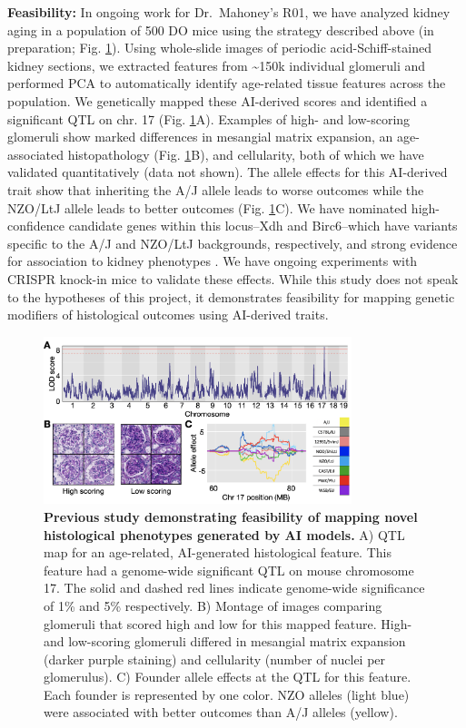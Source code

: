 \documentclass[
  12pt,
]{article}
\begin{document}
\textbf{Feasibility:} In ongoing work for Dr.~Mahoney's R01, we have
analyzed kidney aging in a population of 500 DO mice using the strategy
described above (in preparation; Fig. \ref{fig:histo}). Using
whole-slide images of periodic acid-Schiff-stained kidney sections, we
extracted features from \textasciitilde150k individual glomeruli and
performed PCA to automatically identify age-related tissue features
across the population. We genetically mapped these AI-derived scores and
identified a significant QTL on chr. 17 (Fig. \ref{fig:histo}A).
Examples of high- and low-scoring glomeruli show marked differences in
mesangial matrix expansion, an age-associated histopathology (Fig.
\ref{fig:histo}B), and cellularity, both of which we have validated
quantitatively (data not shown). The allele effects for this AI-derived
trait show that inheriting the A/J allele leads to worse outcomes while
the NZO/LtJ allele leads to better outcomes (Fig. \ref{fig:histo}C). We
have nominated high-confidence candidate genes within this locus--Xdh
and Birc6--which have variants specific to the A/J and NZO/LtJ
backgrounds, respectively, and strong evidence for association to kidney
phenotypes \cite{23249873, 29795190}. We have ongoing experiments with
CRISPR knock-in mice to validate these effects. While this study does
not speak to the hypotheses of this project, it demonstrates feasibility
for mapping genetic modifiers of histological outcomes using AI-derived
traits.

\begin{figure}[ht!]
\includegraphics[width=0.8\textwidth]{Fig5.png} 
\caption{\textbf{Previous study demonstrating feasibility of mapping novel histological phenotypes generated by AI models.} A) QTL map for an age-related, AI-generated histological feature. This feature had a genome-wide significant QTL on mouse chromosome 17. The solid and dashed red lines indicate genome-wide significance of 1\% and 5\% respectively. B) Montage of images comparing glomeruli that scored high and low for this mapped feature. High- and low-scoring glomeruli differed in mesangial matrix expansion (darker purple staining) and cellularity (number of nuclei per glomerulus). C) Founder allele effects at the QTL for this feature. Each founder is represented by one color. NZO alleles (light blue) were associated with better outcomes than A/J alleles (yellow).}
\label{fig:histo}
\end{figure}
\end{document}
